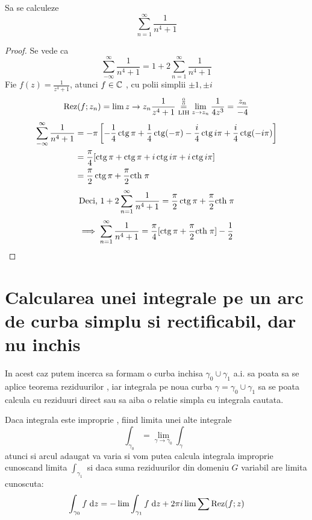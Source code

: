 \begin{aplicatie}
    Sa se calculeze \[ \sum_{n=1}^{\infty} \frac{1}{n^4 + 1}\]
    \begin{proof}
        Se vede ca
        \[
            \sum_{-\infty}^{\infty} \frac{1}{n^4 + 1} = 1 + 2 \sum_{n=1}^{\infty} \frac{1}{n^4 + 1}
        \]
        Fie $\displaystyle f(z) = \frac{1}{z^4+1}$, atunci $f\in \mathcal{\mathbb{C}}$ , cu polii simplii $\pm 1, \pm i$
        \[
            \operatorname{Rez}(f;z_n) = \lim{z \to z_n} \frac{1}{z^4+1}
                \overset{\frac{0}{0}}{\underset{\mathrm{L I H}}{=}} \lim_{z \to z_n} \frac{1}{4z^3}
                =\frac{z_n}{-4}
        \]
        \begin{align*}
          \sum_{-\infty}^{\infty} \frac{1}{n^4 + 1}
            &= - \pi \left[-\frac{1}{4} \operatorname{ctg} \pi + \frac{1}{4} \operatorname{ctg}(-\pi)
              - \frac{i}{4} \operatorname{ctg} i\pi + \frac{i}{4}\operatorname{ctg}(-i\pi)\right] \\
            &= \frac{\pi}{4}[\operatorname{ctg} \pi + \operatorname{ctg} \pi + i\operatorname{ctg} i\pi + i\operatorname{ctg} i\pi] \\
            &= \frac{\pi}{2} \operatorname{ctg} \pi + \frac{\pi}{2} \mathrm{cth}\; \pi
        \end{align*}
        \[
            \text{Deci, } 1 + 2 \sum_{n=1}^{\infty} \frac{1}{n^4 + 1}
                = \frac{\pi}{2} \operatorname{ctg} \pi + \frac{\pi}{2} \mathrm{cth}\; \pi
        \]
        \[
            \implies \sum_{n=1}^{\infty} \frac{1}{n^4 + 1}
                = \frac{\pi}{4} [\operatorname{ctg} \pi + \frac{\pi}{2} \mathrm{cth}\; \pi ] - \frac{1}{2}
        \]

    \end{proof}
\end{aplicatie}

\section{Calcularea unei integrale pe un arc de curba simplu si rectificabil, dar nu inchis}

    In acest caz putem incerca sa formam o curba inchisa $\gamma_0 \cup \gamma_1$
    a.i. sa poata sa se aplice teorema reziduurilor , iar integrala pe noua curba
    $\gamma=\gamma_0 \cup \gamma_1$ sa se poata calcula cu
    reziduuri direct sau sa aiba o relatie simpla cu integrala cautata.

    Daca integrala este improprie , fiind limita unei alte integrale
    \[
        \int_{\gamma_0}= \lim_{\gamma \to \gamma_0} \int_{\gamma}
    \]
    atunci si arcul adaugat va varia si vom putea calcula integrala improprie
    cunoscand limita $\int_{\gamma_1}$ si daca  suma reziduurilor din domeniu $G$
    variabil are limita cunoscuta:
    \[
        \int_{\gamma_0} f \; \mathrm{d} z = - \lim \int_{\gamma_1} f \; \mathrm{d} z + 2 \pi i \lim \sum \operatorname{Rez} (f;z)
    \]

